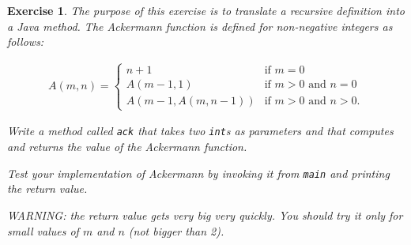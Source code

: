 \documentclass[12pt]{book}
\theoremstyle{exercise}
\newtheorem{exercise}{Exercise}[chapter]
\begin{document}
\begin{exercise}
The purpose of this exercise is to translate a recursive definition into a Java method.
The Ackermann function is defined for non-negative integers as follows:

\begin{eqnarray}
A(m, n) = \begin{cases}
              n+1 & \mbox{if } m = 0 \\
        A(m-1, 1) & \mbox{if } m > 0 \mbox{ and } n = 0 \\
A(m-1, A(m, n-1)) & \mbox{if } m > 0 \mbox{ and } n > 0.
\end{cases}
\end{eqnarray}

Write a method called {\tt ack} that takes two {\tt int}s as parameters and that computes and returns the value of the Ackermann function.

Test your implementation of Ackermann by invoking it from {\tt main} and printing the return value.

WARNING: the return value gets very big very quickly.
You should try it only for small values of $m$ and $n$ (not bigger than 2).
\end{exercise}
\end{document}
